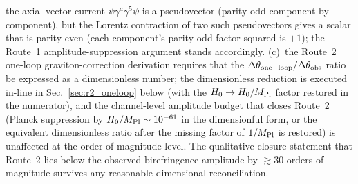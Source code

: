 \documentclass[aps,prd,twocolumn,superscriptaddress,showpacs,preprintnumbers,nofootinbib,longbibliography,floatfix]{revtex4-2}
\newcommand{\MPl}{M_{\rm Pl}}
\begin{document}
the axial-vector current $\bar\psi\gamma^a\gamma^5\psi$ is a pseudovector
(parity-odd component by component), but the Lorentz contraction of two
such pseudovectors gives a scalar that is parity-even (each component's
parity-odd factor squared is $+1$); the Route~1 amplitude-suppression
argument stands accordingly. (c)~the Route~2 one-loop graviton-correction
derivation requires that the $\Delta\theta_{\rm one-loop}/\Delta\theta_{\rm
obs}$ ratio be expressed as a dimensionless number; the dimensionless
reduction is executed in-line in Sec.~\ref{sec:r2_oneloop} below (with
the $H_0\to H_0/M_{\rm Pl}$ factor restored in the numerator), and the
channel-level amplitude budget that closes Route~2 (Planck suppression
by $H_0/\MPl \sim 10^{-61}$ in the dimensionful form, or the equivalent
dimensionless ratio after the missing factor of $1/\MPl$ is restored) is
unaffected at the order-of-magnitude level. The qualitative closure
statement that Route~2 lies below the observed birefringence amplitude by
$\gtrsim 30$ orders of magnitude survives any reasonable dimensional
reconciliation.
\end{document}
